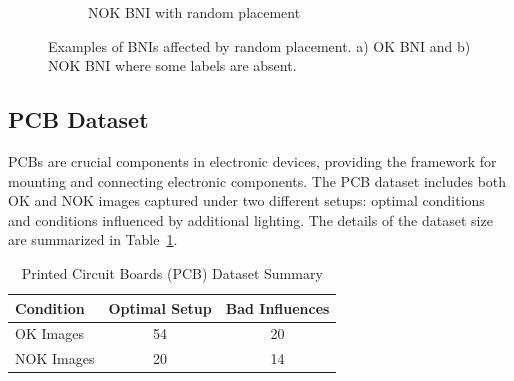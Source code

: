 \documentclass[12pt,DIV14,BCOR12mm,a4paper,footinclude=false,headinclude,parskip=half-,twoside,openright,cleardoublepage=empty,toc=index,bibliography=totoc,listof=totoc]{scrreprt}
\numberwithin{equation}{chapter}
\begin{document}
\begin{enumerate}
\begin{figure}
\begin{subfigure}[b]{0.45\textwidth}
            \caption{NOK BNI with random placement}
        \end{subfigure}
        \caption{Examples of BNIs affected by random placement. a) OK BNI and b) NOK BNI where some labels are absent.}
        \label{fig:random_placement}
    \end{figure}
\end{enumerate}

\subsection{PCB Dataset}
PCBs are crucial components in electronic devices, providing the framework for mounting and connecting electronic components. The PCB dataset includes both OK and NOK images captured under two different setups: optimal conditions and conditions influenced by additional lighting. The details of the dataset size are summarized in Table~\ref{tab:pcb-dataset}.
\begin{table}
    \centering
    \caption{Printed Circuit Boards (PCB) Dataset Summary}
    \label{tab:pcb-dataset}
    \begin{tabular}{lcc}
        \toprule
        \textbf{Condition} & \textbf{Optimal Setup} & \textbf{Bad Influences} \\ 
        \midrule
        OK Images          & 54                     & 20                      \\ 
        NOK Images         & 20                     & 14                      \\ 
        \bottomrule
    \end{tabular}
\end{table}
\end{document}

